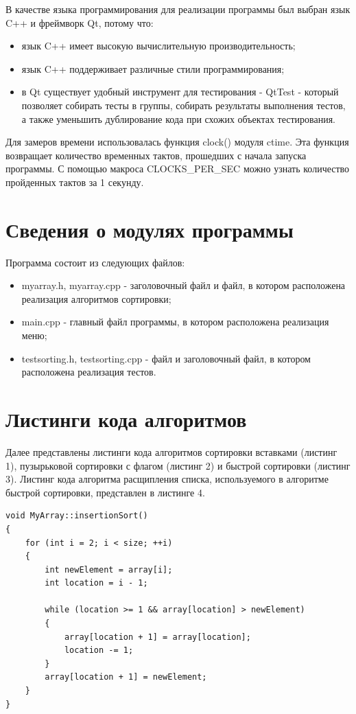 \documentclass[a4paper,14pt]{report}
\begin{document}
В качестве языка программирования для реализации программы был выбран язык C++ и фреймворк Qt, потому что:
\begin{itemize}
	\item язык C++ имеет высокую вычислительную производительность;
	\item язык C++ поддерживает различные стили программирования;
	\item в Qt существует удобный инструмент для тестирования - QtTest - который позволяет собирать тесты в группы, собирать результаты выполнения тестов, а также уменьшить дублирование кода при схожих объектах тестирования.
\end{itemize}

Для замеров времени использовалась функция clock() модуля ctime. Эта функция возвращает количество временных тактов, прошедших с начала запуска программы. С помощью макроса CLOCKS\_PER\_SEC можно узнать количество пройденных тактов за 1 секунду.

\section*{Сведения о модулях программы}

Программа состоит из следующих файлов:
\begin{itemize}
	\item myarray.h, myarray.cpp - заголовочный файл и файл, в котором расположена реализация алгоритмов сортировки;
	\item main.cpp - главный файл программы, в котором расположена реализация меню;
	\item testsorting.h, testsorting.cpp - файл и заголовочный файл, в котором расположена реализация тестов.
\end{itemize}


\section*{Листинги кода алгоритмов}

Далее представлены листинги кода алгоритмов сортировки вставками (листинг 1), пузырьковой сортировки с флагом (листинг 2) и быстрой сортировки (листинг 3). Листинг кода алгоритма расщипления списка, используемого в алгоритме быстрой сортировки, представлен в листинге 4.

\begin{lstlisting}[label=some-code,caption=Алгоритм сортировки вставками]
void MyArray::insertionSort()
{
    for (int i = 2; i < size; ++i)
    {
        int newElement = array[i];
        int location = i - 1;

        while (location >= 1 && array[location] > newElement)
        {
            array[location + 1] = array[location];
            location -= 1;
        }
        array[location + 1] = newElement;
    }
}
\end{lstlisting}
\end{document}

